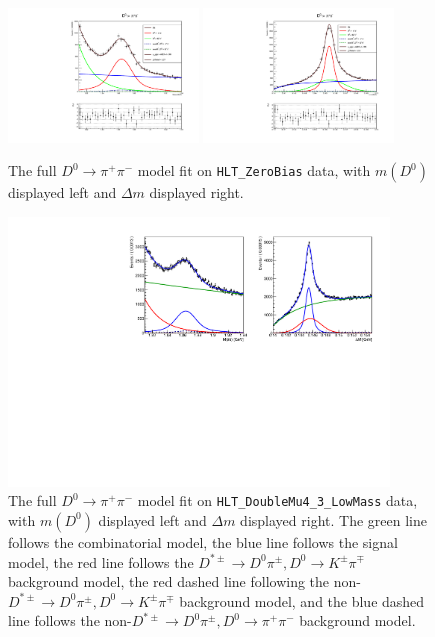 \begin{figure}[htp]
    \begin{center}
      \includegraphics[width=0.45\textwidth]{figures/chapter4/normalization_fit/m_pipiDimuon_afterMvaCut.pdf}
      \includegraphics[width=0.45\textwidth]{figures/chapter4/normalization_fit/dm_pipiDimuon_afterMvaCut.pdf}\\
    \end{center}
    \caption{
        The full $D^0 \to \pi^+ \pi^-$ model fit on \texttt{HLT\_ZeroBias} data, with $m(D^0)$ displayed left and $\Delta m$ displayed right.
    }
    \label{fig:d0pipi_uml_fit}
\end{figure}

\begin{figure}[htp]
    \begin{center}
      \includegraphics[width=0.9\textwidth]{figures/chapter4/normalization_fit/dpipi_fit.pdf}
    \end{center}
    \caption{
      The full $D^0 \to \pi^+ \pi^-$ model fit on \texttt{HLT\_DoubleMu4\_3\_LowMass} data, with $m(D^0)$ displayed left and $\Delta m$ displayed right. The green line follows the combinatorial model, the blue line follows the signal model, the red line follows the $D^{*\pm} \to D^0\pi^\pm, D^0 \to K^\pm \pi^\mp$ background model, the red dashed line following the non-$D^{*\pm} \to D^0\pi^\pm, D^0 \to K^\pm \pi^\mp$ background model, and the blue dashed line follows the non-$D^{*\pm} \to D^0\pi^\pm, D^0 \to \pi^+ \pi^-$ background model.
    }
    \label{fig:d0pipi_uml_fit_dimuon}
\end{figure}


